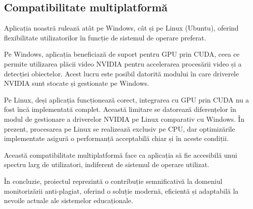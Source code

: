 \documentclass[12pt,a4paper]{article}
\begin{document}
\subsection{Compatibilitate multiplatformă}
Aplicația noastră rulează atât pe Windows, cât și pe Linux (Ubuntu), oferind flexibilitate utilizatorilor în funcție de sistemul de operare preferat. 

Pe Windows, aplicația beneficiază de suport pentru GPU prin CUDA, ceea ce permite utilizarea plăcii video NVIDIA pentru accelerarea procesării video și a detecției obiectelor. Acest lucru este posibil datorită modului în care driverele NVIDIA sunt stocate și gestionate pe Windows.

Pe Linux, deși aplicația funcționează corect, integrarea cu GPU prin CUDA nu a fost încă implementată complet. Această limitare se datorează diferențelor în modul de gestionare a driverelor NVIDIA pe Linux comparativ cu Windows. În prezent, procesarea pe Linux se realizează exclusiv pe CPU, dar optimizările implementate asigură o performanță acceptabilă chiar și în aceste condiții.

Această compatibilitate multiplatformă face ca aplicația să fie accesibilă unui spectru larg de utilizatori, indiferent de sistemul de operare utilizat.

În concluzie, proiectul reprezintă o contribuție semnificativă la domeniul monitorizării anti-plagiat, oferind o soluție modernă, eficientă și adaptabilă la nevoile actuale ale sistemelor educaționale.
\end{document}

